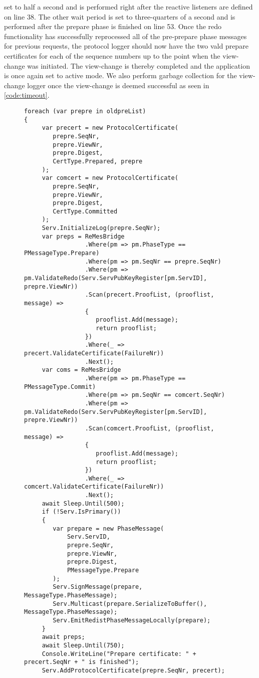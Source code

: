 set to half a second and is performed right after the reactive listeners are defined on line 38. The other wait period is set to three-quarters of a second and is performed after the prepare phase is finished on line 53. Once the redo functionality has successfully reprocessed all of the pre-prepare phase messages for previous requests, the protocol logger should now have the two vald prepare certificates for each of the sequence numbers up to the point when the view-change was initiated. The view-change is thereby completed and the application is once again set to active mode. We also perform garbage collection for the view-change logger once the view-change is deemed successful as seen in \autoref{code:timeout}.
\fi

\begin{figure}[H]
	\centering
	\begin{lstlisting}[label = code:redoprotocol, caption=Redo Protocol Functionality, captionpos = b, basicstyle=\scriptsize]
foreach (var prepre in oldpreList)
{
     var precert = new ProtocolCertificate(
	    prepre.SeqNr, 
	    prepre.ViewNr, 
	    prepre.Digest, 
	    CertType.Prepared, prepre
     );
     var comcert = new ProtocolCertificate(
        prepre.SeqNr, 
        prepre.ViewNr, 
        prepre.Digest, 
        CertType.Committed
     );
     Serv.InitializeLog(prepre.SeqNr);
     var preps = ReMesBridge
     	         .Where(pm => pm.PhaseType == PMessageType.Prepare)
                 .Where(pm => pm.SeqNr == prepre.SeqNr)
                 .Where(pm => pm.ValidateRedo(Serv.ServPubKeyRegister[pm.ServID], prepre.ViewNr))
                 .Scan(precert.ProofList, (prooflist, message) =>
                 {
                    prooflist.Add(message);
                    return prooflist;
                 })
                 .Where(_ => precert.ValidateCertificate(FailureNr))
                 .Next();
     var coms = ReMesBridge
                 .Where(pm => pm.PhaseType == PMessageType.Commit)
                 .Where(pm => pm.SeqNr == comcert.SeqNr)
                 .Where(pm => pm.ValidateRedo(Serv.ServPubKeyRegister[pm.ServID], prepre.ViewNr))
                 .Scan(comcert.ProofList, (prooflist, message) =>
                 {
                    prooflist.Add(message);
                    return prooflist;
                 })
                 .Where(_ => comcert.ValidateCertificate(FailureNr))
                 .Next();
     await Sleep.Until(500);              
     if (!Serv.IsPrimary())
     {
        var prepare = new PhaseMessage(
            Serv.ServID, 
            prepre.SeqNr, 
            prepre.ViewNr, 
            prepre.Digest, 
            PMessageType.Prepare
        );
        Serv.SignMessage(prepare, MessageType.PhaseMessage);
        Serv.Multicast(prepare.SerializeToBuffer(), MessageType.PhaseMessage);
        Serv.EmitRedistPhaseMessageLocally(prepare);
     }
     await preps;
     await Sleep.Until(750);
     Console.WriteLine("Prepare certificate: " + precert.SeqNr + " is finished");
     Serv.AddProtocolCertificate(prepre.SeqNr, precert);


\end{lstlisting}
\end{figure}
